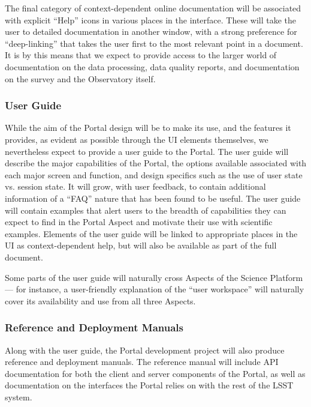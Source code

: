 The final category of context-dependent online documentation will be associated with explicit ``Help'' icons in various places in the interface.
These will take the user to detailed documentation in another window, with a strong preference for ``deep-linking'' that takes the user first to the most relevant point in a document.
It is by this means that we expect to provide access to the larger world of documentation on the data processing, data quality reports, and documentation on the survey and the Observatory itself. 

\subsubsection{User Guide}\label{user-guide}

While the aim of the Portal design will be to make its use, and the features it provides, as evident as possible through the UI elements themselves, we nevertheless expect to provide a user guide to the Portal.
The user guide will describe the major capabilities of the Portal, the options available associated with each major screen and function, and design specifics such as the use of user state vs. session state.
It will grow, with user feedback, to contain additional information of a ``FAQ'' nature that has been found to be useful.
The user guide will contain examples that alert users to the breadth of capabilities they can expect to find in the Portal Aspect and motivate their use with scientific examples.
Elements of the user guide will be linked to appropriate places in the UI as context-dependent help, but will also be available as part of the full document.

Some parts of the user guide will naturally cross Aspects of the Science Platform --- for instance, a user-friendly explanation of the ``user workspace'' will naturally cover its availability and use from all three Aspects.

\subsubsection{Reference and Deployment Manuals}

Along with the user guide, the Portal development project will also produce reference and deployment manuals.
The reference manual will include API documentation for both the client and server components of the Portal, as well as documentation on the interfaces the Portal relies on with the rest of the LSST system.

